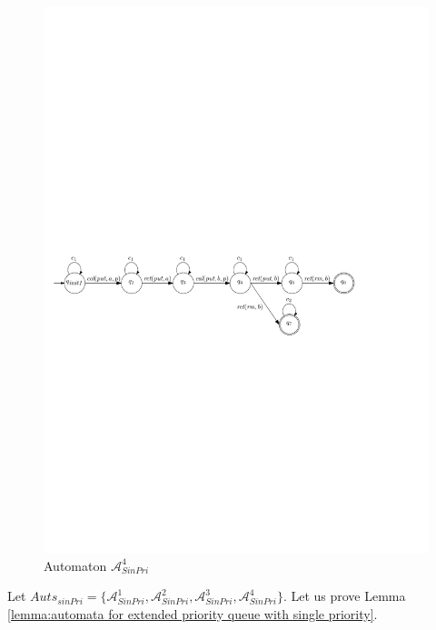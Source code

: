 \begin{figure}[htbp]
  \centering
  \includegraphics[width=0.9 \textwidth]{figures/PIC_AUTO_FIFO_4.pdf}
  \caption{Automaton $\mathcal{A}_{\textit{SinPri}}^4$}
  \label{fig:automata for FIFO-4}
\end{figure}

Let $\textit{Auts}_{\textit{sinPri}} = \{ \mathcal{A}_{\textit{SinPri}}^1, \mathcal{A}_{\textit{SinPri}}^2, \mathcal{A}_{\textit{SinPri}}^3, \mathcal{A}_{\textit{SinPri}}^4 \}$. Let us prove Lemma \ref{lemma:automata for extended priority queue with single priority}.

\AutoForEPQwithSignlePri*

